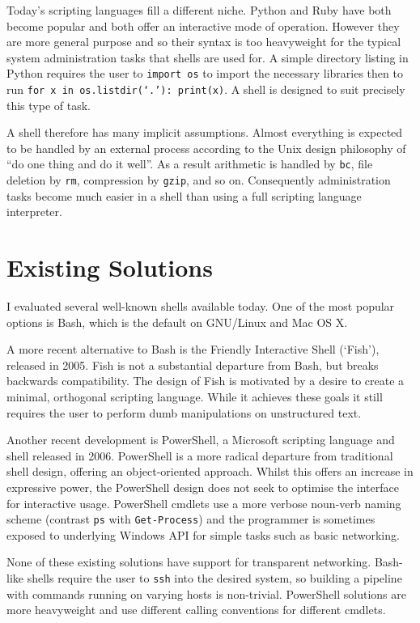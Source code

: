 \documentclass[12pt,twoside,notitlepage]{report}
\begin{document}
Today's scripting languages fill a different niche. Python and Ruby
have both become popular and both offer an interactive mode of
operation. However they are more general purpose and so their syntax
is too heavyweight for the typical system administration tasks that
shells are used for. A simple directory listing in Python requires the
user to {\tt import os} to import the necessary libraries then to run
{\tt for x in os.listdir(`.'): print(x)}. A shell is designed to suit
precisely this type of task.

A shell therefore has many implicit assumptions. Almost everything is
expected to be handled by an external process according to the Unix
design philosophy of ``do one thing and do it well''. As a result
arithmetic is handled by {\tt bc}, file deletion by {\tt rm},
compression by {\tt gzip}, and so on. Consequently administration
tasks become much easier in a shell than using a full scripting
language interpreter.

\section{Existing Solutions}
I evaluated several well-known shells available today. One of the most popular
options is Bash, which is the default on GNU/Linux and Mac OS X.

A more recent alternative to Bash is the Friendly Interactive Shell (`Fish'),
released in 2005. Fish is not a substantial departure from Bash, but breaks
backwards compatibility. The design of Fish \cite{fishdesign} is motivated by a
desire to create a minimal, orthogonal scripting language. While it achieves
these goals it still requires the user to perform dumb manipulations on
unstructured text.

Another recent development is PowerShell, a Microsoft scripting
language and shell released in 2006. PowerShell is a more radical
departure from traditional shell design, offering an object-oriented
approach. Whilst this offers an increase in expressive power, the
PowerShell design does not seek to optimise the interface for
interactive usage. PowerShell cmdlets use a more verbose noun-verb
naming scheme (contrast {\tt ps} with {\tt Get-Process}) and the
programmer is sometimes exposed to underlying Windows API for simple
tasks such as basic networking.

None of these existing solutions have support for transparent
networking. Bash-like shells require the user to {\tt ssh} into the
desired system, so building a pipeline with commands running on
varying hosts is non-trivial. PowerShell solutions are more
heavyweight and use different calling conventions for different
cmdlets.
\end{document}
